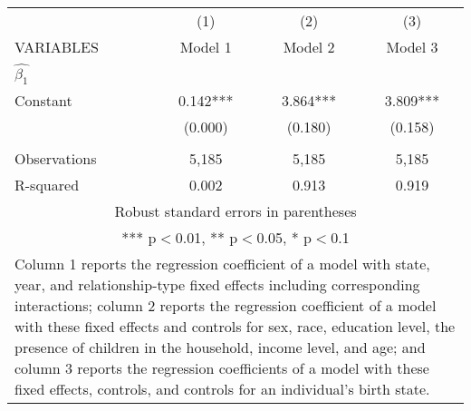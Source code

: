 \begin{tabular}{lccc}
\hline
 & (1) & (2) & (3) \\
VARIABLES & Model 1 & Model 2 & Model 3 \\ \hline
 $\hat{\beta_1}$ &  &  &  \\
Constant & 0.142*** & 3.864*** & 3.809*** \\
 & (0.000) & (0.180) & (0.158) \\
 &  &  &  \\
Observations & 5,185 & 5,185 & 5,185 \\
 R-squared & 0.002 & 0.913 & 0.919 \\ \hline
\multicolumn{4}{c}{ Robust standard errors in parentheses} \\
\multicolumn{4}{c}{ *** p$<$0.01, ** p$<$0.05, * p$<$0.1} \\
\multicolumn{4}{p{0.8\linewidth}}{\small Column 1 reports the regression coefficient of a model with state, year, and relationship-type fixed effects including corresponding interactions; column 2 reports the regression coefficient of a model with these fixed effects and controls for sex, race, education level, the presence of children in the household, income level, and age; and column 3 reports the regression coefficients of a model with these fixed effects, controls, and controls for an individual’s birth state.} \\
\end{tabular}
